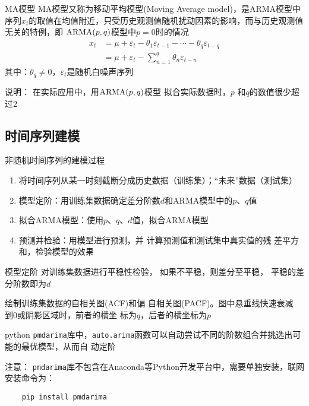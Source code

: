 \documentclass[t]{beamer}
\begin{document}
\begin{frame}[fragile]{MA模型}
    MA模型又称为移动平均模型(Moving Average model)，是ARMA模型中序列$x_t$的取值在均值附近，只受历史观测值随机扰动因素的影响，而与历史观测值无关的特例，即 ${\rm ARMA}(p,q)$模型中$p=0$时的情况
    \[\begin{split}
 x_t&= \mu+\varepsilon_t-\theta_1\varepsilon_{t-1}-\cdots -\theta_q\varepsilon_{t-q}         \\
&=\mu+\varepsilon_t-\sum_{n=1}^{q}\theta_n\varepsilon_{t-n} 
    \end{split} \]
其中：$\theta_q\ne 0$，$\varepsilon_t$是随机白噪声序列

\begin{block}{说明：}
    在实际应用中，用${\rm ARMA}(p,q)$模型
拟合实际数据时，$p$
和$q$的数值很少超过2
\end{block}
\end{frame}


    \subsection{时间序列建模}
\begin{frame}[fragile]{非随机时间序列的建模过程}
\begin{enumerate}
    \item 将时间序列从某一时刻截断分成历史数据（训练集）；“未来”数据（测试集）
    \item 模型定阶：用训练集数据确定差分阶数$d$和ARMA模型中的$p$、$q$值
    \item 拟合ARMA模型：使用$p$、$q$、$d$值，拟合ARMA模型
    \item 预测并检验：用模型进行预测，并
    计算预测值和测试集中真实值的残
    差平方和，检验模型的效果
\end{enumerate}
\end{frame}

\begin{frame}[fragile]{模型定阶}
    对训练集数据进行平稳性检验，
    如果不平稳，则差分至平稳，
    平稳的差分阶数即为$d$

    绘制训练集数据的自相关图(ACF)和偏
    自相关图(PACF)。图中悬垂线快速衰减
    到0或阴影区域时，前者的横坐
    标为$q$，后者的横坐标为$p$

    python \verb|pmdarima|库中，\verb|auto.arima|函数可以自动尝试不同的阶数组合并挑选出可能的最优模型，从而自
    动定阶

\begin{block}{注意：}
    \verb|pmdarima|库不包含在Anaconda等Python开发平台中，需要单独安装，联网安装命令为：
\begin{lstlisting}
    pip install pmdarima
\end{lstlisting}
\end{block}
\end{frame}
\end{document}
